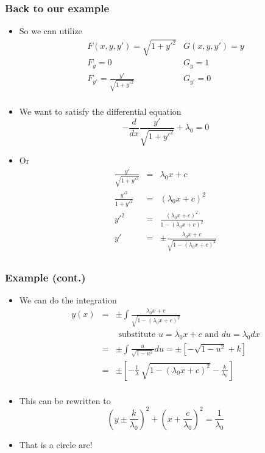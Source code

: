 \documentclass[10pt]{beamer}
\begin{document}
\begin{frame}
  \frametitle{Back to our example}
  \begin{itemize}
  \item So we can utilize
    \[
      \begin{array}{cc}
        F(x,y,y') = \sqrt{ 1 + y'^2 } & G( x, y, y') = y\\
        F_y = 0 & G_y = 1\\
        F_{y'} = \frac{ y' }{ \sqrt{ 1 + y'^2 } } & G_{y'} = 0\\
      \end{array}
    \]
  \item We want to satisfy the differential equation
    \[
      - \frac{d}{dx} \frac{y'}{ \sqrt{ 1+y'^2 } } + \lambda_0 = 0
    \]
  \item Or
    \[
      \begin{array}{rcl}
        \frac{y'}{\sqrt{1+y'^2}} &=& \lambda_0 x + c   \\
        \frac{y'^2}{1+y'^2} &=& (\lambda_0 x+c)^2\\
        y'^2 &=& \frac{(\lambda_0 x + c)^2}{  1 - (\lambda_0 x +c )^2}\\
        y' & =& \pm \frac{\lambda_0 x + c}{\sqrt{1 - (\lambda_0 x +c )^2}}\\
      \end{array}
    \]
  \end{itemize}
\end{frame}

\begin{frame}
  \frametitle{Example (cont.)}
  \begin{itemize}
  \item We can do the integration
    \[
      \begin{array}{rcl}
        y(x) &=& \pm \int \frac{\lambda_0 x + c}{\sqrt{1 - (\lambda_0 x +c )^2}}\\
             && \mbox{ substitute } u = \lambda_0 x + c \mbox{ and } du = \lambda_0 dx \\
             &=& \pm \int \frac{u}{\sqrt{1-u^2}} du = \pm \left[ - \sqrt{1-u^2} + k \right] \\
             &=& \pm \left[ - \frac{ 1 }{ \lambda } ~  \sqrt{ 1 - ( \lambda_0 x + c )^2}   - \frac{k}{\lambda_0} \right]\\
      \end{array}
    \]
  \item This can be rewritten to
    \[
      \left( y \pm \frac{k}{\lambda_0} \right)^2  +
      \left( x + \frac{c}{\lambda_0} \right)^2 =
      \frac{1}{\lambda_0}
    \]
  \item That is a circle arc!
  \end{itemize}
\end{frame}
\end{document}
